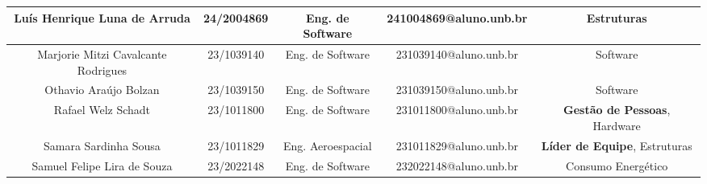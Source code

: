 \begin{landscape}
\begin{table}[htpb]
\begin{center}
\begin{tabular}{|c|c|c|c|c|}
Luís Henrique Luna de Arruda      & 24/2004869        & Eng. de Software       & 241004869@aluno.unb.br &  Estruturas \\ \hline
Marjorie Mitzi Cavalcante Rodrigues     & 23/1039140       & Eng. de Software       & 231039140@aluno.unb.br & Software \\ \hline
Othavio Araújo Bolzan     & 23/1039150        & Eng. de Software       & 231039150@aluno.unb.br & Software \\ \hline
Rafael Welz Schadt       & 23/1011800        & Eng. de Software     & 231011800@aluno.unb.br   & \textbf{Gestão de Pessoas}, Hardware\\ \hline
Samara Sardinha Sousa      & 23/1011829        & Eng. Aeroespacial       & 231011829@aluno.unb.br & \textbf{Líder de Equipe}, Estruturas\\ \hline
Samuel Felipe Lira de Souza       & 23/2022148        & Eng. de Software       & 232022148@aluno.unb.br        & Consumo Energético \\ \hline

\end{tabular}
\end{center}
\end{table}



\end{landscape}
